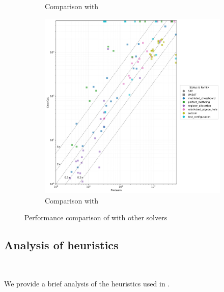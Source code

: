 \begin{figure}[!t]
\begin{subfigure}[t]{0.3\textwidth}
        \caption{Comparison with \prelearn}
        \label{fig:cautical-vs-prelearn}
    \end{subfigure}
    \begin{subfigure}[t]{0.3\textwidth}
        \centering
        \includegraphics[width=\textwidth]{figs/prelearn_vs_cautical_interesting_legend.jpg}
        \caption{Comparison with \prelearn}
        \label{fig:cautical-vs-prelearn}
    \end{subfigure}

    \caption{Performance comparison of \tool with other solvers}
\end{figure}


\subsection{Analysis of heuristics}~\label{subsec:eval-heuristics}

We provide a brief analysis of the heuristics used in \tool.


